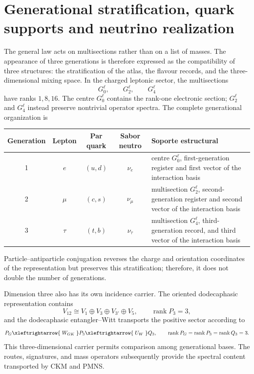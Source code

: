 \section{Generational stratification, quark supports and neutrino realization}
\label{sec:generaciones-quarks-neutrinos-rev2}

The general law acts on multisections rather than on a list of masses. The
appearance of three generations is therefore expressed as the compatibility of
three structures: the stratification of the atlas, the flavour records, and the
three-dimensional mixing space. In the charged leptonic sector, the
multisections
\begin{equation}
 G_0^{\ell},\qquad G_2^{\ell},\qquad G_4^{\ell}
 \label{eq:tres-multisecciones-leptonicas-rev2}
\end{equation}
have ranks \(1,8,16\). The centre \(G_0^\ell\) contains the rank-one
electronic section; \(G_2^\ell\) and \(G_4^\ell\) instead preserve
nontrivial operator spectra. The complete generational organization
is
\begin{center}
\small
\begin{tabularx}{0.96\textwidth}{@{}c c c c X@{}}
\toprule
\textbf{Generation} & \textbf{Lepton} & \textbf{Par quark} &
\textbf{Sabor neutro} & \textbf{Soporte estructural}\\
\midrule
1 & \(e\) & \((u,d)\) & \(\nu_e\) & centre \(G_0^\ell\), first-generation register and first vector of the interaction basis\\
2 & \(\mu\) & \((c,s)\) & \(\nu_\mu\) & multisection \(G_2^\ell\),
second-generation register and second vector of the interaction basis\\
3 & \(\tau\) & \((t,b)\) & \(\nu_\tau\) & multisection \(G_4^\ell\),
third-generation record, and third vector of the interaction basis\\
\bottomrule
\end{tabularx}
\end{center}
Particle--antiparticle conjugation reverses the charge and orientation
coordinates of the representation but preserves this stratification;
therefore, it does not double the number of generations.

Dimension three also has its own incidence carrier. The oriented
dodecaphasic representation contains
\begin{equation}
 V_{12}\cong V_1\oplus V_3\oplus V_{3'}\oplus V_5,
 \qquad \operatorname{rank}P_3=3,
 \label{eq:descomposicion-rango-tres-generaciones-rev2}
\end{equation}
and the dodecaphasic entangler--Witt transports the positive sector according to
\begin{equation}
 P_G\xleftrightarrow{\;W_{GK}\;}P_3
 \xleftrightarrow{\;U_W\;}Q_3,
 \qquad
 \operatorname{rank}P_G=\operatorname{rank}P_3
 =\operatorname{rank}Q_3=3.
 \label{eq:transporte-rango-tres-generaciones-rev2}
\end{equation}
This three-dimensional carrier permits comparison among generational bases. The
routes, signatures, and mass operators subsequently provide the spectral
content transported by CKM and PMNS.

